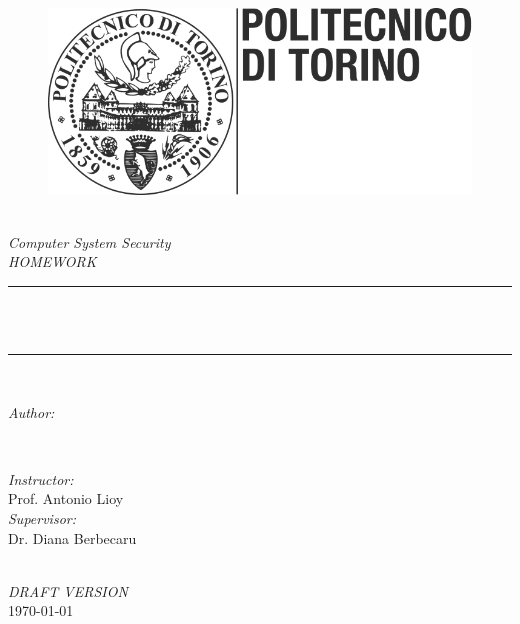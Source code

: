 \begin{titlepage}
\newcommand{\HRule}{\rule{\linewidth}{0.5mm}}
\begin{figure}[!htb]
   \begin{minipage}{\textwidth}
     \centering
     \includegraphics[width=.3\linewidth]{title/polito_logo.png}
   \end{minipage}\hfill
   
\end{figure}

\center 
\quad\\[1.5cm]

\textsl{\Large Computer System Security}\\[1.5cm] 
\textsl{\large HOMEWORK}\\[1.5cm] 
\makeatletter
\HRule \\[0.5cm]
{ \huge \bfseries \@title}\\[0.5cm] 
\HRule \\[1.5cm]
\begin{minipage}{0.4\textwidth}
\begin{flushleft} \large
\emph{Author:}\\
\@author 
\end{flushleft}
\end{minipage}
~
\begin{minipage}{0.4\textwidth}
\begin{flushright} \large
\emph{Instructor:} \\
\textup{Prof. Antonio Lioy} \\
\vspace{1cm}
\emph{Supervisor:} \\
\textup{Dr. Diana Berbecaru}
\end{flushright}
\end{minipage}\\[3cm]
\makeatother
\vspace{1cm}
\textsl{\large \color{blue} DRAFT VERSION \color{black}}\\[1.5cm] 
{\large \today}\\[2cm] 
\vfill 
\end{titlepage}